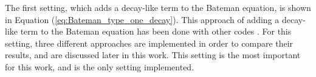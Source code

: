 The first setting, which adds a decay-like term to the Bateman equation, is shown in Equation (\ref{eq:Bateman_type_one_decay}). This approach of adding a decay-like term to the Bateman equation has been done with other codes \cite{jr_vicente_valdez_modeling_2020, rodriguez-vieitez_transmutation_2002}. For this setting, three different approaches are implemented in order to compare their results, and are discussed later in this work. This setting is the most important for this work, and is the only setting implemented.







